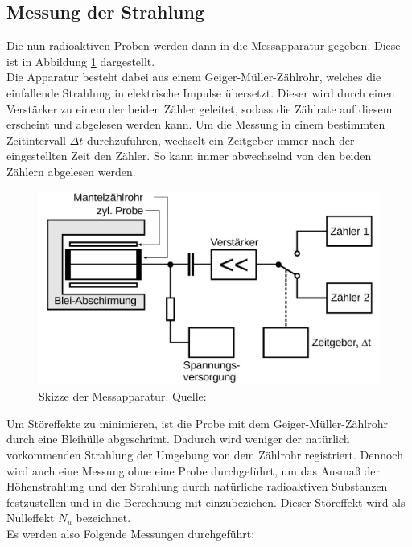 \subsection{Messung der Strahlung}
\label{sec:Messung}
Die nun radioaktiven Proben werden dann in die Messapparatur gegeben. Diese ist in Abbildung 
\ref{fig:Apparatur} dargestellt.\\
Die Apparatur besteht dabei aus einem Geiger-Müller-Zählrohr, welches die einfallende Strahlung in 
elektrische Impulse übersetzt. Dieser wird durch einen Verstärker zu einem der beiden Zähler geleitet, 
sodass die Zählrate auf diesem erscheint und abgelesen werden kann. Um die Messung in einem bestimmten
Zeitintervall $\Delta t$ durchzuführen, wechselt ein Zeitgeber immer nach der eingestellten Zeit den 
Zähler. So kann immer abwechselnd von den beiden Zählern abgelesen werden.
\begin{figure}[H]
    \centering
    \includegraphics[scale=0.4]{content/Messapparatur.png}
    \caption{Skizze der Messapparatur. Quelle:\cite{AP01}}
    \label{fig:Apparatur}
  \end{figure}
\noindent Um Störeffekte zu minimieren, ist die Probe mit dem Geiger-Müller-Zählrohr durch eine Bleihülle 
abgeschrimt. Dadurch wird weniger der natürlich vorkommenden Strahlung der Umgebung von dem Zählrohr 
registriert. Dennoch wird auch eine Messung ohne eine Probe durchgeführt, um das Ausmaß der 
Höhenstrahlung und der Strahlung durch natürliche radioaktiven Substanzen festzustellen und in die 
Berechnung mit einzubeziehen. Dieser Störeffekt wird als Nulleffekt $N_u$ bezeichnet.
\\
Es werden also Folgende Messungen durchgeführt:
